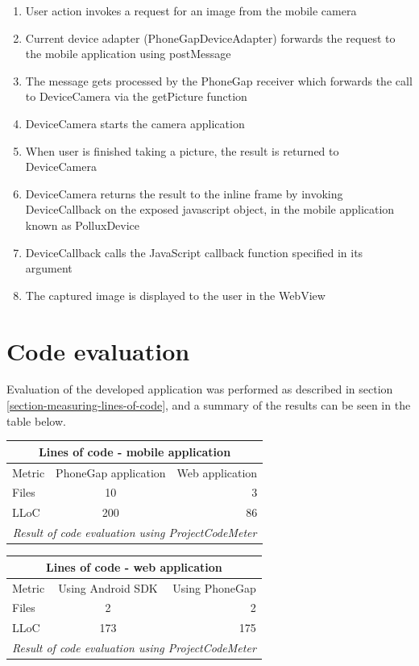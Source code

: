 \begin{enumerate}
	\item User action invokes a request for an image from the mobile camera 
	\item Current device adapter (PhoneGapDeviceAdapter) forwards the request to the mobile application using postMessage
	\item The message gets processed by the PhoneGap receiver which forwards the call to DeviceCamera via the getPicture function
	\item DeviceCamera starts the camera application
	\item When user is finished taking a picture, the result is returned to DeviceCamera
	\item DeviceCamera returns the result to the inline frame by invoking DeviceCallback on the exposed javascript object, in the mobile application known as PolluxDevice
	\item DeviceCallback calls the JavaScript callback function specified in its argument
	\item The captured image is displayed to the user in the WebView
\end{enumerate}


\section{Code evaluation}\label{sec:code-evaluation}
Evaluation of the developed application was performed as described in section \ref{section-measuring-lines-of-code}, and a summary of the results  can be seen in the table below.

\begin{tabular}{ | l | c | r | }
    \hline
    \multicolumn{3}{|c|}{Lines of code - mobile application} \\
    \hline
	Metric & PhoneGap application &  Web application \\
	\hline
	Files & 10 & 3\\
	LLoC & 200 & 86\\	
	\hline
	\multicolumn{3}{c}{\emph{Result of code evaluation using ProjectCodeMeter}}
\end{tabular}

\begin{tabular}{ | l | c | r | }
    \hline
    \multicolumn{3}{|c|}{Lines of code - web application} \\
    \hline
	Metric & Using Android SDK & Using PhoneGap \\
	\hline
	Files & 2 & 2 \\
	LLoC & 173 & 175 \\	
	\hline
	\multicolumn{3}{c}{\emph{Result of code evaluation using ProjectCodeMeter}}
\end{tabular}

